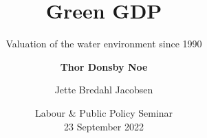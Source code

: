 \usepackage{hyperref}
\usepackage[utf8]{inputenc} %
\usepackage{lmodern,textcomp} %

\usepackage{amssymb}
\usepackage{amsmath}
\usepackage{bm} %
\usepackage{cancel} %

\usepackage{appendixnumberbeamer}
\usepackage{epigraph}
\usepackage{multicol}
\usepackage{multirow,array}
\usepackage[super,negative]{nth} %
\usepackage{tcolorbox}




\setcounter{MaxMatrixCols}{10}
\newenvironment{stepenumerate}{\begin{enumerate}[<+->]}{\end{enumerate}}
\newenvironment{stepitemize}{\begin{itemize}[<+->]}{\end{itemize} }
\newenvironment{stepenumeratewithalert}{\begin{enumerate}[<+-| alert@+>]}{\end{enumerate}}
\newenvironment{stepitemizewithalert}{\begin{itemize}[<+-| alert@+>]}{\end{itemize} }


\title[Green GDP: The Water Environment]{Green GDP}
\subtitle{Valuation of the water environment since 1990}
\author[Thor Donsby Noe]{\textbf{Thor Donsby Noe} \and Jette Bredahl Jacobsen}
\date[23 September 2022]{Labour \& Public Policy Seminar\\
      23 September 2022}

% 